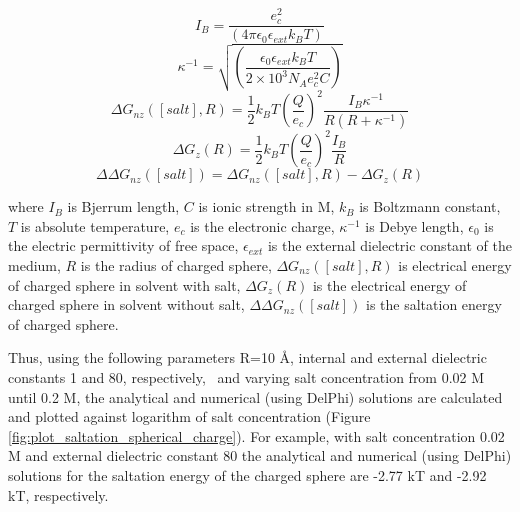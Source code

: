 \documentclass[9pt,tutorial]{livecoms}
\begin{document}
\begin{equation}
I_B = \frac{e_c^2}{(4\pi\epsilon_0\epsilon_{ext}k_BT)} 
\end{equation}
\begin{equation}
\kappa^{-1} = \sqrt{\left(\frac{\epsilon_0\epsilon_{ext}k_BT}{2 \times 10^3N_Ae_c^2 C} \right)}
\end{equation}
\begin{equation}
\Delta G_{nz}([salt], R) = \frac{1}{2}k_B T \left(\frac{Q}{e_c}\right)^2\frac{I_B \kappa^{-1}}{R(R+\kappa^{-1})}
\end{equation}
\begin{equation}
\Delta G_z(R) = \frac{1}{2}k_B T \left(\frac{Q}{e_c}\right)^2\frac{I_B}{R}
\end{equation}
\begin{equation}\label{eqn:saltation_23}
\Delta\Delta G_{nz}([salt]) = \Delta G_{nz}([salt], R) - \Delta G_z(R)
\end{equation}

where $I_B$ is Bjerrum length, $ C $ is ionic strength in M, $ k_B $ is Boltzmann constant, $ T $ is absolute temperature, $ e_c $ is the electronic charge, $ \kappa^{-1} $ is Debye length, $ \epsilon_0 $ is the electric permittivity of free space, $ \epsilon_{ext} $ is the external dielectric constant of the medium, $ R $ is the radius of charged sphere, $ \Delta G_{nz}([salt], R) $ is electrical energy of charged sphere in solvent with salt, $ \Delta G_z(R) $ is the electrical energy of charged sphere in solvent without salt, $ \Delta\Delta G_{nz}([salt]) $ is the saltation energy of charged sphere.

Thus, using the following parameters R=10 Å, internal and external dielectric constants 1 and 80, respectively,  and varying salt concentration from 0.02 M until 0.2 M, the analytical and numerical (using DelPhi) solutions are calculated and plotted against logarithm of salt concentration (Figure \ref{fig:plot_saltation_spherical_charge}). For example, with salt concentration 0.02 M and external dielectric constant 80 the analytical and numerical (using DelPhi) solutions for the saltation energy of the charged sphere are -2.77 kT and -2.92 kT, respectively.
\end{document}

